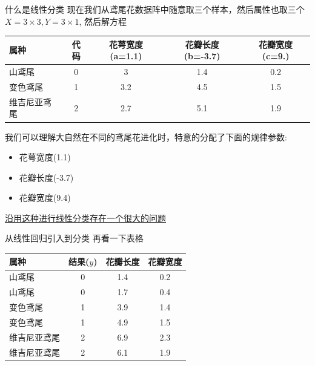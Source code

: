 \documentclass[handout]{ctexbeamer}
\begin{document}
\begin{frame}{什么是线性分类}
现在我们从鸢尾花数据阵中随意取三个样本，然后属性也取三个$X= 3 \times 3, Y = 3 \times 1$, 然后解方程
\begin{table}[H]
		\centering
{\footnotesize
		\begin{tabular}{lcccc}
		\hline 
			属种 & 代码 & 花萼宽度(a=1.1) &花瓣长度(b=-3.7) & 花瓣宽度(c=9.) \\
			\hline 
			山鸢尾 & 0 & 3 &  1.4 & 0.2 \\
			变色鸢尾 & 1 & 3.2 & 4.5  & 1.5 \\
			维吉尼亚鸢尾 & 2 & 2.7 &  5.1 & 1.9  \\
			\hline  
		\end{tabular}
}
\end{table}
我们可以理解大自然在不同的鸢尾花进化时，特意的分配了下面的规律参数:
		\begin{itemize}
			\item 花萼宽度(1.1)
			\item 花瓣长度(-3.7)
			\item 花瓣宽度(9.4)
		\end{itemize}
	\underline{沿用这种进行线性分类存在一个很大的问题}
\end{frame}

\begin{frame}{从线性回归引入到分类}
再看一下表格
		\begin{table}[H]
		\centering
		\begin{tabular}{lccc}
		\hline 
			属种 & 结果($y$) &花瓣长度 & 花瓣宽度 \\
			\hline 
			山鸢尾 & 0 & 1.4 & 0.2 \\
			山鸢尾 & 0 & 1.7 & 0.4 \\
			变色鸢尾 & 1 & 3.9  & 1.4 \\
			变色鸢尾 & 1& 4.9 & 1.5 \\
			维吉尼亚鸢尾 & 2 & 6.9 & 2.3  \\
			维吉尼亚鸢尾 & 2 & 6.1 & 1.9 \\
			\hline  
		\end{tabular}
\end{table}	
\end{frame}
\end{document}
